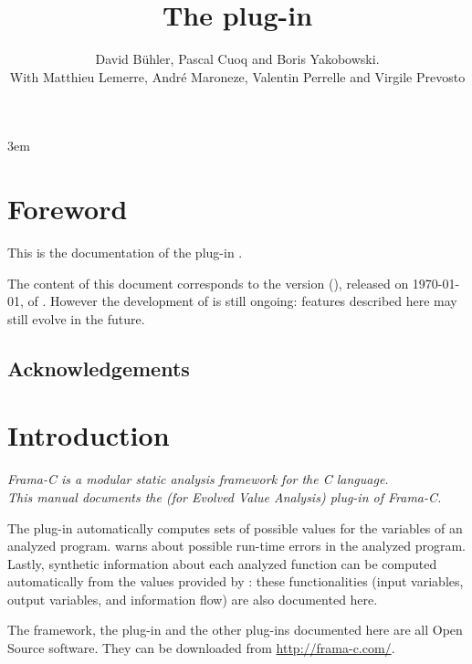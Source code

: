 \documentclass{frama-c-book}
\title{The \Eva{} plug-in}
\author{David Bühler, Pascal Cuoq and Boris Yakobowski. \\
With Matthieu Lemerre, André Maroneze,
Valentin Perrelle and Virgile Prevosto}
\newcommand{\framacversion}%
           { (\unskip)}
\begin{document}
\sloppy
\emergencystretch 3em

\maketitle
\tableofcontents

\chapter*{Foreword}
\markright{}

This is the documentation of the \FramaC plug-in \Eva.

The content of this document corresponds to the version \framacversion, released
on \today, of \FramaC. However the development of \FramaC is still ongoing:
features described here may still evolve in the future.

\section*{Acknowledgements}

\medskip


\chapter{Introduction}\label{introduction}
\vspace{2cm}

{\em Frama-C is a modular static analysis framework for the C language.\\
This manual documents the \Eva{} (for \emph{Evolved Value Analysis}) plug-in of Frama-C.}
\vspace{2cm}

The \Eva{} plug-in automatically computes sets of possible
values for the variables of an analyzed program. \Eva{}
warns about possible run-time errors in the analyzed program.
Lastly, synthetic information
about each analyzed function can be computed automatically from the
values provided by \Eva{}: these functionalities (input
variables, output variables, and information flow) are also documented
here.  \bigskip

The framework, the \Eva{} plug-in and the other plug-ins
documented here are all Open Source software. They can be
downloaded from \url{http://frama-c.com/}.
\bigskip
\end{document}
